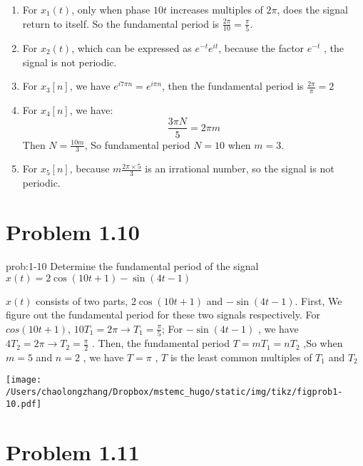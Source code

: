 \documentclass[koma,a4paper,utopia,12pt,listings-color,microtype,paralist,colorlinks,urlcolor=red]{org-article}
\begin{document}
\begin{enumerate}
\item For \(x_{1}(t)\), only when phase \(10t\) increases multiples of \(2\pi\),
does the signal return to itself. So the fundamental period is \(\frac{2\pi}{10} = \frac{\pi}{5}\).
\item For \(x_{2}(t)\), which can be expressed as \(e^{-t}e^{it}\), because the
factor \(e^{-t}\) , the signal is not periodic.
\item For \(x_{3}[ n ]\), we have \(e^{i7\pi n} = e^{i\pi n}\), then the
fundamental period is \(\frac{2\pi}{\pi} = 2\)
\item For \(x_{4}[n]\), we have:
\begin{equation*}
\frac{3\pi N}{5} = 2\pi m
\end{equation*}
Then \(N = \frac{10m}{3}\), So fundamental period \(N=10\) when \(m=3\).
\item For \(x_{5}[n]\), because \(m\frac{2\pi \times 5}{ 3 }\) is an irrational number, so
the signal is not periodic.
\end{enumerate}
\section{Problem 1.10}
\label{sec:org6ae4e57}


\begin{prob}[]{prob:1-10}
Determine the fundamental period of the signal \(x(t) = 2\cos(10t + 1) -
     \sin(4t -1)\)
\label{prob:1-10}
\end{prob}

\(x(t)\) consists of two parts, \(2\cos(10t + 1)\) and \(-\sin(4t -1)\).
First, We figure out the fundamental period for these two signals
respectively. For \(cos(10t + 1)\), \(10T_{1} = 2\pi \to T_{1} =
     \frac{\pi}{5}\);  For \(-\sin(4t -1)\) , we have \(4T_{2} = 2\pi \to T_{2}
     = \frac{\pi}{2}\)  . Then, the fundamental period \(T = mT_{1} = nT_{2}\)
,So when \(m=5\) and  \(n=2\) , we have \(T=\pi\) , \(T\)  is the least
common multiples of \(T_{1}\) and \(T_{2}\)

\begin{center}
\texttt{[image: /Users/chaolongzhang/Dropbox/mstemc\_hugo/static/img/tikz/figprob1-10.pdf]}
\end{center}
\section{Problem 1.11}
\label{sec:org7a4aebe}
\end{document}
